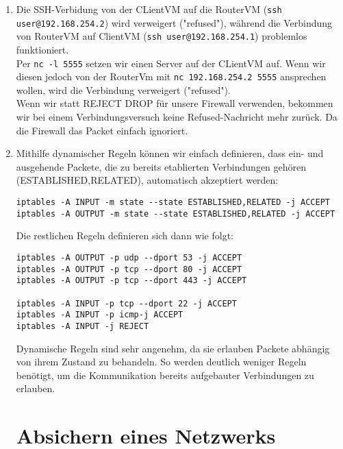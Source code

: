 \documentclass{scrartcl}
\begin{document}
\begin{enumerate}[\bfseries 1.]
        \item
                Die SSH-Verbidung von der CLientVM auf die RouterVM
                      (\texttt{ssh user@192.168.254.2}) wird verweigert ("refused"),
                      während die Verbindung von RouterVM auf ClientVM
                      (\texttt{ssh user@192.168.254.1}) problemlos funktioniert.\\
                Per \texttt{nc -l 5555} setzen wir einen Server auf der CLientVM
                      auf. Wenn wir diesen jedoch von der RouterVm mit
                      \texttt{nc 192.168.254.2 5555} ansprechen wollen, wird die
                      Verbindung verweigert ("refused").\\
                Wenn wir statt REJECT DROP für unsere Firewall verwenden,
                      bekommen wir bei einem Verbindungsversuch keine Refused-Nachricht
                      mehr zurück. Da die Firewall das Packet einfach ignoriert.

        \item Mithilfe dynamischer Regeln können wir einfach definieren, dass ein- und
              ausgehende Packete, die zu bereits etablierten Verbindungen gehören
              (ESTABLISHED,RELATED), automatisch akzeptiert werden:
              \begin{lstlisting}
iptables -A INPUT -m state --state ESTABLISHED,RELATED -j ACCEPT
iptables -A OUTPUT -m state --state ESTABLISHED,RELATED -j ACCEPT
              \end{lstlisting}
              Die restlichen Regeln definieren sich dann wie folgt:
              \begin{lstlisting}[]
iptables -A OUTPUT -p udp --dport 53 -j ACCEPT
iptables -A OUTPUT -p tcp --dport 80 -j ACCEPT
iptables -A OUTPUT -p tcp --dport 443 -j ACCEPT

iptables -A INPUT -p tcp --dport 22 -j ACCEPT
iptables -A INPUT -p icmp-j ACCEPT
iptables -A INPUT -j REJECT
              \end{lstlisting}
              Dynamische Regeln sind sehr angenehm, da sie erlauben Packete abhängig
              von ihrem Zustand zu behandeln. So werden deutlich weniger Regeln benötigt,
              um die Kommunikation bereits aufgebauter Verbindungen zu erlauben.

  \section{Absichern eines Netzwerks}
  \label{sec:Absichern eines Netzwerks}

\end{enumerate}
\end{document}

